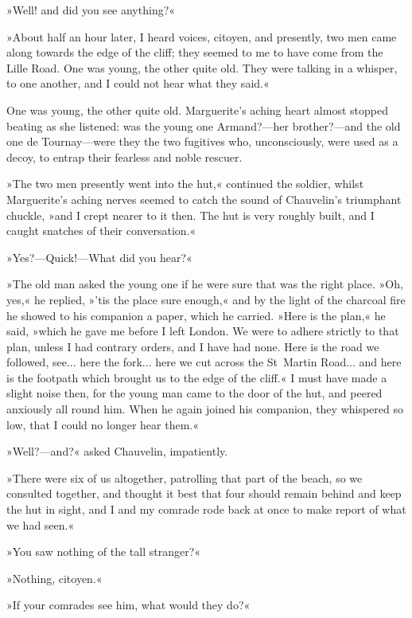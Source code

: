 »Well! and did you see anything?«

»About half an hour later, I heard voices, citoyen, and presently, two men came along towards the edge of the cliff; they seemed to me to have come from the Lille Road. One was young, the other quite old. They were talking in a whisper, to one another, and I could not hear what they said.«

One was young, the other quite old. Marguerite's aching heart almost stopped beating as she listened: was the young one Armand?\allowbreak---\allowbreak her brother?\allowbreak---\allowbreak and the old one de Tournay\allowbreak---\allowbreak were they the two fugitives who, unconsciously, were used as a decoy, to entrap their fearless and noble rescuer.

»The two men presently went into the hut,« continued the soldier, whilst Marguerite's aching nerves seemed to catch the sound of Chauvelin's triumphant chuckle, »and I crept nearer to it then. The hut is very roughly built, and I caught snatches of their conversation.«

»Yes?\allowbreak---\allowbreak Quick!\allowbreak---\allowbreak What did you hear?«

»The old man asked the young one if he were sure that was the right place. »Oh, yes,« he replied, »'tis the place sure enough,« and by the light of the charcoal fire he showed to his companion a paper, which he carried. »Here is the plan,« he said, »which he gave me before I left London. We were to adhere strictly to that plan, unless I had contrary orders, and I have had none. Here is the road we followed, see... here the fork... here we cut across the St~Martin Road... and here is the footpath which brought us to the edge of the cliff.« I must have made a slight noise then, for the young man came to the door of the hut, and peered anxiously all round him. When he again joined his companion, they whispered so low, that I could no longer hear them.«

»Well?\allowbreak---\allowbreak and?« asked Chauvelin, impatiently.

»There were six of us altogether, patrolling that part of the beach, so we consulted together, and thought it best that four should remain behind and keep the hut in sight, and I and my comrade rode back at once to make report of what we had seen.«

»You saw nothing of the tall stranger?«

»Nothing, citoyen.«

»If your comrades see him, what would they do?«

